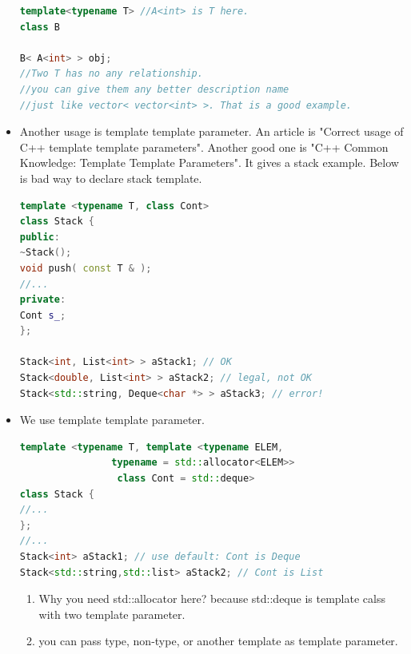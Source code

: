 \documentclass[a4paper,12pt,twoside]{book}
\begin{document}
\begin{itemize}
\begin{lstlisting}[frame=single, language=c++]
template<typename T> //A<int> is T here.
class B

B< A<int> > obj;
//Two T has no any relationship.
//you can give them any better description name
//just like vector< vector<int> >. That is a good example.
\end{lstlisting}

\item Another usage is template template parameter. An article is "Correct usage of C++ template template parameters". Another good one is "C++ Common Knowledge: Template Template Parameters". It gives a stack example. Below is bad way to declare stack template.
\begin{lstlisting}[frame=single, language=c++]
template <typename T, class Cont>
class Stack {
public:
~Stack();
void push( const T & );
//...
private:
Cont s_;
};

Stack<int, List<int> > aStack1; // OK
Stack<double, List<int> > aStack2; // legal, not OK           
Stack<std::string, Deque<char *> > aStack3; // error!   
\end{lstlisting}
\item We use template template parameter. 
\begin{lstlisting}[frame=single, language=c++]
template <typename T, template <typename ELEM,
				typename = std::allocator<ELEM>>
				 class Cont = std::deque>
class Stack {
//...
};
//...
Stack<int> aStack1; // use default: Cont is Deque
Stack<std::string,std::list> aStack2; // Cont is List
\end{lstlisting}
\begin{enumerate}
	\item Why you need std::allocator here? because std::deque is template calss with two template parameter.
	\item you can pass type, non-type, or another template as template parameter. 
	
\end{enumerate}

\end{itemize}
\end{document}
